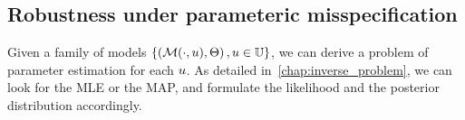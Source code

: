 \documentclass[../../Main_ManuscritThese.tex]{subfiles}
\begin{document}
\begin{table}[htb]
\centering
{}
\caption{Types of problems, depending on their deterministic nature for the constraints or the objective. Shaded cells correspond to problems comprising an uncertain part. Reproduced from~\cite{lelievre_consideration_2016}}
\label{tab:lelievre}
\end{table}



\subsection{Robustness under parameteric misspecification}

Given a family of models $\left\{\left(\mathcal{M}(\cdot, u), \Theta\right), u\in\mathbb{U}\right\}$, we can derive a problem of parameter estimation for each $u$. As detailed in~\cref{chap:inverse_problem}, we can look for the MLE or the MAP, and formulate the likelihood and the posterior distribution accordingly.
\end{document}
